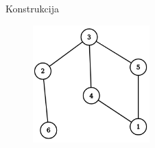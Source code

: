 \begin{statement}[
  problempoints=110,
  timelimit=1 sekunda,
  memorylimit=512 MiB,
]{Konstrukcija}
\setlength\intextsep{-0.5cm}
\begin{figure}
\centering
\includegraphics[width=0.4\textwidth]{graph.png}
\end{figure}

\end{statement}

